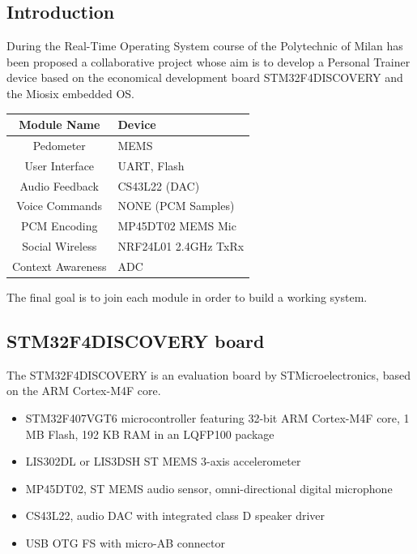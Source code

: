 \documentclass[a4paper,10pt]{article}
\makeatletter
\newenvironment{tablehere}{\def\@captype{table}\vspace{2ex}}{\vspace{1ex}}
\makeatother
\begin{document}
\vspace{4ex}	%
\begin{multicols}{2}

\section{Introduction}
During the Real-Time Operating System course of the Polytechnic of Milan has been
proposed a collaborative project whose aim is to develop a Personal Trainer device
based on the economical development board STM32F4DISCOVERY and the 
Miosix embedded OS. 


\begin{tablehere}
\centering
\begin{tabular}{|c|l|} \hline
{\bf Module Name} & {\bf Device}\\ \hline
Pedometer & MEMS \\
User Interface & UART, Flash\\
Audio Feedback & CS43L22 (DAC) \\
Voice Commands & NONE (PCM Samples) \\
PCM Encoding & MP45DT02 MEMS Mic\\
Social Wireless & NRF24L01 2.4GHz TxRx\\
Context Awareness & ADC \\ \hline
\end {tabular}
\caption{Group modules} 
\end{tablehere} 


The final goal is to join each module in order to build a working system.

\subsection{STM32F4DISCOVERY board}

The STM32F4DISCOVERY is an evaluation board by STMicroelectronics, based on the ARM Cortex-M4F core.

{\small
\begin{itemize}
\item STM32F407VGT6 microcontroller featuring 32-bit ARM Cortex-M4F core, 1 MB Flash, 192 KB RAM in an LQFP100 package
\item LIS302DL or LIS3DSH ST MEMS 3-axis accelerometer
\item MP45DT02, ST MEMS audio sensor, omni-directional digital microphone
\item CS43L22, audio DAC with integrated class D speaker driver
\item USB OTG FS with micro-AB connector
\end{itemize}
}


\end{multicols}
\end{document}

